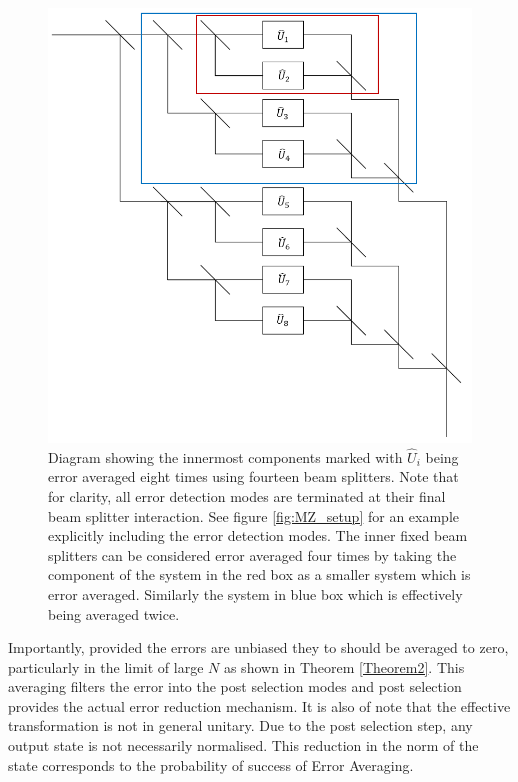 \documentclass[aps,pra,twocolumn,superscriptaddress,numerical]{revtex4-1}
\begin{document}
	\begin{figure}
		\includegraphics[width=\columnwidth]{unitaries.PNG}
		\caption{\label{fig:gen system}Diagram showing the innermost components marked with $\hat{U}_i$ being error averaged eight times using fourteen beam splitters. Note that for clarity, all error detection modes are terminated at their final beam splitter interaction. See figure \ref{fig:MZ_setup} for an example explicitly including the error detection modes. The inner fixed beam splitters can be considered error averaged four times by taking the component of the system in the red box as a smaller system which is error averaged. Similarly the system in blue box which is effectively being averaged twice.}
	\end{figure}

	Importantly, provided the errors are unbiased they to should be averaged to zero, particularly in the limit of large $N$ as shown in Theorem \ref{Theorem2}. This averaging filters the error into the post selection modes and post selection provides the actual error reduction mechanism. It is also of note that the effective transformation is not in general unitary. Due to the post selection step, any output state is not necessarily normalised. This reduction in the norm of the state corresponds to the probability of success of Error Averaging.
		
\end{document}

